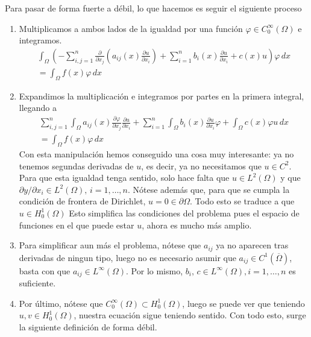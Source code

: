 \documentclass[a4paper,11pt,spanish, twoside, leqno]{tfg-uam}
\theoremstyle{definition}
\begin{document}
Para pasar de forma fuerte a débil, lo que hacemos es seguir el siguiente proceso
\begin{enumerate}
    \item Multiplicamos a ambos lados de la igualdad por una función $\varphi \in C^\infty_0(\Omega)$ e integramos.
    \begin{align*}
        \int_\Omega\left(-\sum_{i,j=1}^{n} \frac{\partial}{\partial x_j}\left( a_{ij}(x)\frac{\partial u}{\partial x_i}\right) + \sum_{i=1}^{n} b_i(x)\frac{\partial u}{\partial x_i} + c(x)u \right) \varphi  \,dx\\ =\int_\Omega f(x)\varphi  \,dx
    \end{align*}
    \item Expandimos la multiplicación e integramos por partes en la primera integral, llegando a
    \begin{align*}
        \sum_{i,j=1}^{n} \int_\Omega a_{ij}(x) \frac{\partial \varphi }{\partial x_j} \frac{\partial u}{\partial x_i} + \sum_{i=1}^{n} \int_\Omega b_i(x)\frac{\partial u}{\partial x_i}\varphi  + \int_\Omega c(x)\varphi u  \,dx\\ =\int_\Omega f(x)\varphi  \,dx
    \end{align*}
    Con esta manipulación hemos conseguido una cosa muy interesante: ya no tenemos segundas derivadas de $u$, es decir, ya no necesitamos que $u\in C^2$. Para que esta igualdad tenga sentido, solo hace falta que $u\in L^2(\Omega)$ y que $\partial y /\partial x_i \in L^2(\Omega),\, i =1,\dots,n$. Nótese además que, para que se cumpla la condición de frontera de Dirichlet, $u=0 \in \partial\Omega$. Todo esto se traduce a que $u\in H_0^1(\Omega)$ Esto simplifica las condiciones del problema pues el espacio de funciones en el que puede estar $u$, ahora es mucho más amplio.
    \item Para simplificar aun más el problema, nótese que $a_{ij}$ ya no aparecen tras derivadas de ningun tipo, luego no es necesario asumir que $a_{ij}\in C^1(\overline{\Omega})$, basta con que $a_{ij}\in L^\infty(\Omega)$. Por lo mismo, $b_i,\,c\in L^\infty(\Omega), i=1,\dots,n$ es suficiente.
    \item Por último, nótese que $C^\infty_0(\Omega) \subset H^1_0(\Omega)$, luego se puede ver que teniendo $u,v\in H^1_0(\Omega)$, nuestra ecuación sigue teniendo sentido. Con todo esto, surge la siguiente definición de forma débil.
\end{enumerate}
\end{document}
